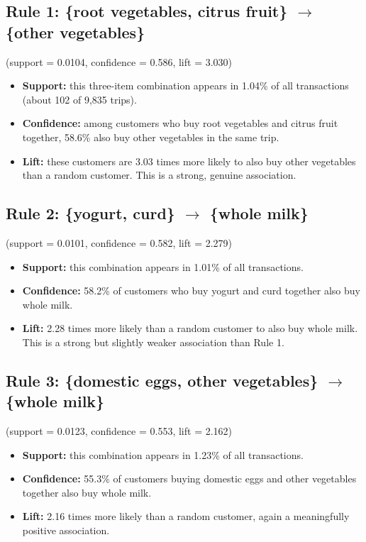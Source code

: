 \documentclass[11pt]{article}
\begin{document}
\subsection*{Rule 1: \{root vegetables, citrus fruit\} $\rightarrow$ \{other vegetables\}}
(support = 0.0104, confidence = 0.586, lift = 3.030)
\begin{itemize}
    \item \textbf{Support:} this three-item combination appears in 1.04\% of all transactions (about 102 of 9,835 trips).
    \item \textbf{Confidence:} among customers who buy root vegetables and citrus fruit together, 58.6\% also buy other vegetables in the same trip.
    \item \textbf{Lift:} these customers are 3.03 times more likely to also buy other vegetables than a random customer. This is a strong, genuine association.
\end{itemize}

\subsection*{Rule 2: \{yogurt, curd\} $\rightarrow$ \{whole milk\}}
(support = 0.0101, confidence = 0.582, lift = 2.279)
\begin{itemize}
    \item \textbf{Support:} this combination appears in 1.01\% of all transactions.
    \item \textbf{Confidence:} 58.2\% of customers who buy yogurt and curd together also buy whole milk.
    \item \textbf{Lift:} 2.28 times more likely than a random customer to also buy whole milk. This is a strong but slightly weaker association than Rule 1.
\end{itemize}

\subsection*{Rule 3: \{domestic eggs, other vegetables\} $\rightarrow$ \{whole milk\}}
(support = 0.0123, confidence = 0.553, lift = 2.162)
\begin{itemize}
    \item \textbf{Support:} this combination appears in 1.23\% of all transactions.
    \item \textbf{Confidence:} 55.3\% of customers buying domestic eggs and other vegetables together also buy whole milk.
    \item \textbf{Lift:} 2.16 times more likely than a random customer, again a meaningfully positive association.
\end{itemize}
\end{document}
